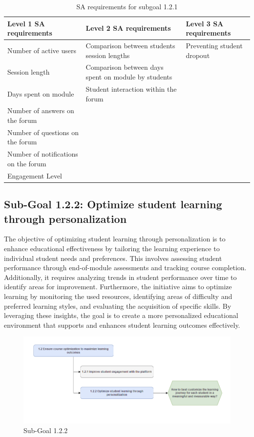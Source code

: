\begin{table}[H]
\begin{center}
\begin{tabular}{ | m{5cm} | m{5cm}| m{5cm} | } 
  \hline
  \textbf{Level 1 SA requirements} & \textbf{Level 2 SA requirements}  & \textbf{Level 3 SA requirements}  \\ 
  \hline
  Number of active users &  Comparison between students session lengths & Preventing student dropout \\ 
  \hline
  Session length & Comparison between days spent on module by students & \\ 
  \hline
  Days spent on module & Student interaction within the forum & \\
  \hline
  Number of answers on the forum &  & \\ 
  \hline
  Number of questions on the forum &  & \\ 
  \hline
  Number of notifications on the forum &  & \\ 
  \hline
  Engagement Level & & \\ 
  \hline
\end{tabular}
\end{center}
\caption{SA requirements for subgoal 1.2.1}
\end{table}

\newpage
\subsection{Sub-Goal 1.2.2: Optimize student learning through personalization}
The objective of optimizing student learning through personalization is to enhance educational effectiveness by tailoring the learning experience to individual student needs and preferences. This involves assessing student performance through end-of-module assessments and tracking course completion. Additionally, it requires analyzing trends in student performance over time to identify areas for improvement. Furthermore, the initiative aims to optimize learning by monitoring the used resources, identifying areas of difficulty and preferred learning styles, and evaluating the acquisition of specific skills. By leveraging these insights, the goal is to create a more personalized educational environment that supports and enhances student learning outcomes effectively.
\begin{figure}[H]
    \centering
    \includegraphics[width=\textwidth]{./assets/subgoal_1.2.2.png}
    \caption{Sub-Goal 1.2.2}
    \label{fig:subgoal1.2.2}
\end{figure}


